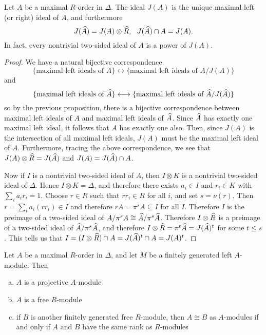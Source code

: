 \begin{thm}
Let $A$ be a maximal $R$-order in $\Delta$.  The ideal $J(A)$ is the unique maximal left (or right) ideal of $A$, and furthermore
$$J(\widehat A) = J(A)\otimes\widehat R,\ \ J(\widehat A)\cap A = J(A).$$
In fact, every nontrivial two-sided ideal of $A$ is a power of $J(A)$.
\end{thm}
\begin{proof}
We have a natural bijective correspondence
$$\{\text{maximal left ideals of $A$}\}\longleftrightarrow \{\text{maximal left ideals of $A/J(A)$}\}$$
and
$$\{\text{maximal left ideals of $\widehat A$}\}\longleftrightarrow \{\text{maximal left ideals of $\widehat A/J(\widehat A)$}\}$$
so by the previous proposition, there is a bijective correspondence between maximal left ideals of $A$ and maximal left ideals of $\widehat A$.  Since $\widehat A$ has exactly one maximal left ideal, it follows that $A$ has exactly one also.  Then, since $J(A)$ is the intersection of all maximal left ideals, $J(A)$ must be the maximal left ideal of $A$.  Furthermore, tracing the above correspondence, we see that $J(A)\otimes\widehat R = J(\widehat A)$ and $J(A) = J(\widehat A)\cap A$.

Now if $I$ is a nontrivial two-sided ideal of $A$, then $I\otimes K$ is a nontrivial two-sided ideal of $\Delta$.  Hence $I\otimes K = \Delta$, and therefore there exists $a_i\in I$ and $r_i\in K$ with $\sum_i a_ir_i = 1$.  Choose $r\in R$ such that $rr_i\in R$ for all $i$, and set $s = \nu(r)$.  Then $r = \sum_i a_i(rr_i)\in I$ and therefore $rA = \pi^sA\subseteq I$ for all $I$.  Therefore $I$ is the preimage of a two-sided ideal of $A/\pi^sA\cong \widehat A/\pi^s\widehat A$.  Therefore $I\otimes \widehat R$ is a preimage of a two-sided ideal of $\widehat A/\pi^s\widehat A$, and therefore $I\otimes\widehat R = \pi^t \widehat A = J(\widehat A)^t$ for some $t\leq s$.  This tells us that $I = (I\otimes \widehat R)\cap A = J(\widehat A)^t\cap A = J(A)^t$.
\end{proof}

\begin{lem}
Let $A$ be a maximal $R$-order in $\Delta$, and let $M$ be a finitely generated left $A$-module.  Then
\begin{enumerate}[(a)]
\item  $A$ is a projective $A$-module
\item  $A$ is a free $R$-module
\item  if $B$ is another finitely generated free $R$-module, then $A\cong B$ as $A$-modules if and only if $A$ and $B$ have the same rank as $R$-modules
\end{enumerate}
\end{lem}

